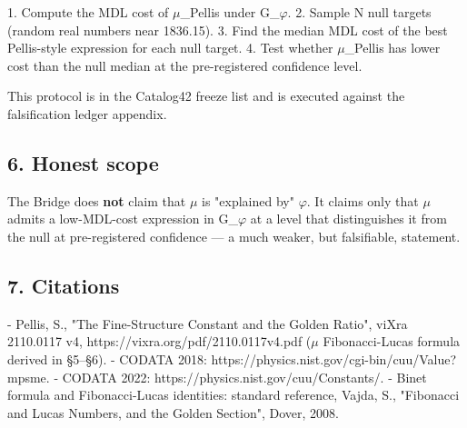 1. Compute the MDL cost of $\mu$\_Pellis under G\_$\varphi$.
2. Sample N null targets (random real numbers near 1836.15).
3. Find the median MDL cost of the best Pellis-style expression for each null target.
4. Test whether $\mu$\_Pellis has lower cost than the null median at the pre-registered confidence level.

This protocol is in the Catalog42 freeze list and is executed against the falsification ledger appendix.

\subsection{6. Honest scope}

The Bridge does \textbf{not} claim that $\mu$ is "explained by" $\varphi$. It claims only that $\mu$ admits a low-MDL-cost expression in G\_$\varphi$ at a level that distinguishes it from the null at pre-registered confidence --- a much weaker, but falsifiable, statement.

\subsection{7. Citations}

- Pellis, S., "The Fine-Structure Constant and the Golden Ratio", viXra 2110.0117 v4, https://vixra.org/pdf/2110.0117v4.pdf ($\mu$ Fibonacci-Lucas formula derived in §5--§6).
- CODATA 2018: https://physics.nist.gov/cgi-bin/cuu/Value?mpsme.
- CODATA 2022: https://physics.nist.gov/cuu/Constants/.
- Binet formula and Fibonacci-Lucas identities: standard reference, Vajda, S., "Fibonacci and Lucas Numbers, and the Golden Section", Dover, 2008.
